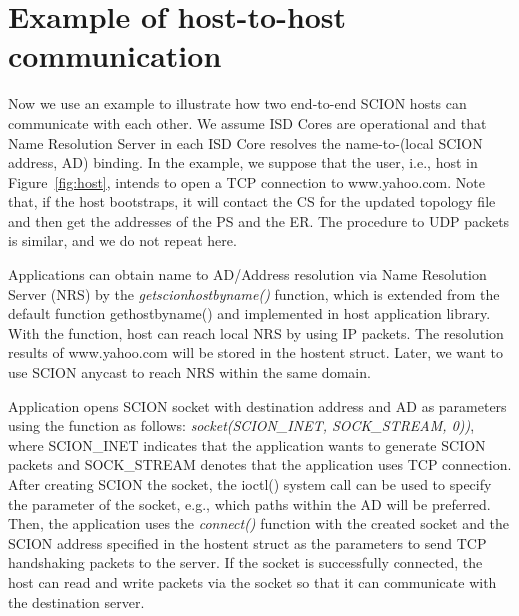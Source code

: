 
\section{Example of host-to-host communication}

Now we use an example to illustrate how two end-to-end SCION hosts
can communicate with each other. We assume ISD Cores are operational
and that Name Resolution Server in each ISD Core resolves the
name-to-(local SCION address, AD) binding. In the example, we
suppose that the user, i.e., host in Figure~\ref{fig:host}, intends
to open a TCP connection to www.yahoo.com. Note that, if the host
bootstraps, it will contact the CS for the updated topology file and
then get the addresses of the PS and the ER. The procedure to  UDP
packets is similar, and we do not repeat here.

Applications can obtain name to AD/Address resolution via Name
Resolution Server (NRS) by the {\em getscionhostbyname()} function,
which is extended from the default function gethostbyname() and
implemented in host application library. With the function, host can
reach local NRS by using IP packets. The resolution results of
www.yahoo.com will be stored in the hostent struct. Later, we want
to use SCION anycast to reach NRS within the same domain.

Application opens SCION socket with destination address and AD as
parameters using the function as follows: {\em socket(SCION\_INET,
SOCK\_STREAM, 0))}, where SCION\_INET indicates that the application
wants to generate SCION packets and SOCK\_STREAM denotes that the
application uses TCP connection. After creating SCION the socket,
the ioctl() system call can be used to specify the parameter of the
socket, e.g., which paths within the AD will be preferred. Then, the
application uses the {\em connect()} function with the created
socket and the SCION address specified in the hostent struct as the
parameters to send TCP handshaking packets to the server. If the
socket is successfully connected, the host can read and write
packets via the socket so that it can communicate with the
destination server.

